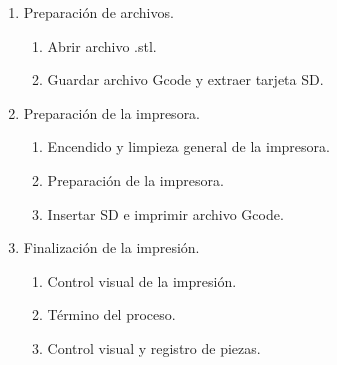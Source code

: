 \begin{enumerate}
\item Preparación de archivos.
\begin{enumerate} 
\item Abrir archivo .stl.
\item Guardar archivo Gcode y extraer tarjeta SD.
\end{enumerate}
\item Preparación de la impresora.
\begin{enumerate}
\item Encendido y limpieza general de la impresora.
\item Preparación de la impresora.
\item Insertar SD e imprimir archivo Gcode.
\end{enumerate}
\item Finalización de la impresión.
\begin{enumerate}
\item Control visual de la impresión.
\item Término del proceso.
\item Control visual y registro de piezas.
\end{enumerate}


\end{enumerate}
